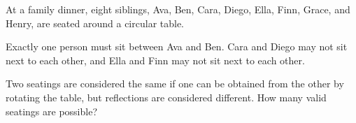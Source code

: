 At a family dinner, eight siblings, Ava, Ben, Cara, Diego, Ella, Finn, Grace, and Henry, are seated around a circular table.

Exactly one person must sit between Ava and Ben. Cara and Diego may not sit next to each other, and Ella and Finn may not sit next to each other.

Two seatings are considered the same if one can be obtained from the other by rotating the table, but reflections are considered different. How many valid seatings are possible?
